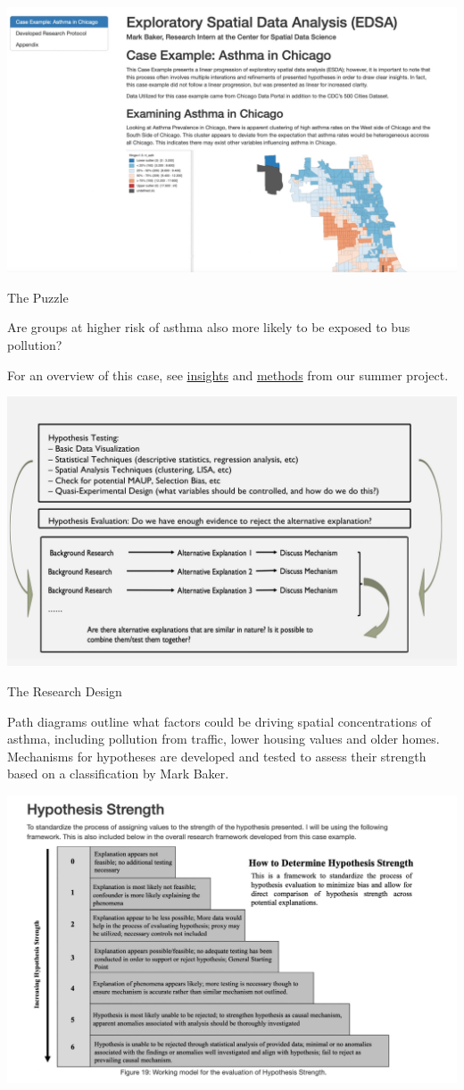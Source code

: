 \documentclass[
]{book}
\begin{document}
\includegraphics{images/asthma1.jpg}

The Puzzle

Are groups at higher risk of asthma also more likely to be exposed to bus pollution?

For an overview of this case, see \href{https://uchicago.box.com/s/zmoyz07zwu2opnuovfrogge6ckkwjtpq}{insights} and \href{https://uchicago.box.com/s/1zo055jgec3sxrygvr0unrtsr8ptvb8v}{methods} from our summer project.

\includegraphics{images/asthma2.jpg}

The Research Design

Path diagrams outline what factors could be driving spatial concentrations of asthma, including pollution from traffic, lower housing values and older homes. Mechanisms for hypotheses are developed and tested to assess their strength based on a classification by Mark Baker.

\includegraphics{images/asthma3.jpg}
\end{document}
